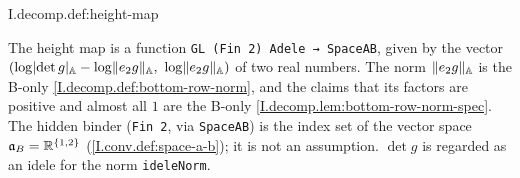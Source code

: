 \begin{definition}
\end{definition}
\begin{tfformal}{I.decomp.def:height-map}
\begin{tffidelity}
The height map is a function \texttt{GL (Fin 2) Adele → SpaceAB}, given by the vector $(\log\lvert\det g\rvert_{\mathbb{A}}-\log\lVert e_2g\rVert_{\mathbb{A}},\ \log\lVert e_2g\rVert_{\mathbb{A}})$ of two real numbers. The norm $\lVert e_2g\rVert_{\mathbb{A}}$ is the B-only \cref{I.decomp.def:bottom-row-norm}, and the claims that its factors are positive and almost all $1$ are the B-only \cref{I.decomp.lem:bottom-row-norm-spec}. The hidden binder (\texttt{Fin 2}, via \texttt{SpaceAB}) is the index set of the vector space $\mathfrak{a}_B=\mathbb{R}^{\{1,2\}}$ (\cref{I.conv.def:space-a-b}); it is not an assumption. $\det g$ is regarded as an idele for the norm \texttt{ideleNorm}.
\end{tffidelity}
\end{tfformal}

